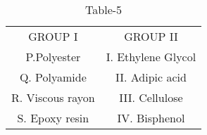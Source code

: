 \begin{table}[H]
    \centering
    \begin{tabular}{c|c}
      GROUP I & GROUP II \\
        P.Polyester & I. Ethylene Glycol\\
        Q. Polyamide & II. Adipic acid\\
        R. Viscous rayon & III. Cellulose\\
        S. Epoxy resin & IV. Bisphenol
    \end{tabular}
    \caption{Table-5}
    \label{tab:tables/table5.tex}
\end{table}
